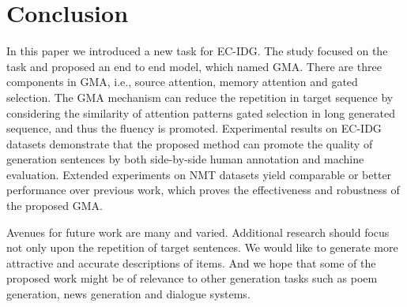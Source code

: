 \documentclass[letterpaper]{article} %
\begin{document}
\section{Conclusion}


In this paper we introduced a new task for EC-IDG.
The study focused on the task and proposed an end to end model, which named GMA. 
There are three components in GMA, i.e., source attention, memory attention and gated selection. 
The GMA mechanism can reduce the repetition in target sequence by considering the similarity of attention patterns gated selection in long generated sequence, and thus the fluency is promoted. 
Experimental results on EC-IDG datasets demonstrate that the proposed method can promote the quality of generation sentences by both side-by-side human annotation and machine evaluation. 
Extended experiments on NMT datasets yield comparable or better performance over previous work, which proves the effectiveness and robustness of the proposed GMA.

Avenues for future work are many and varied.
Additional research should focus not only upon the repetition of target sentences. We would like to generate more attractive and accurate descriptions of items. And we hope that some of the proposed work might be of relevance to other generation tasks such as poem generation, news generation and dialogue systems.


\end{document}
